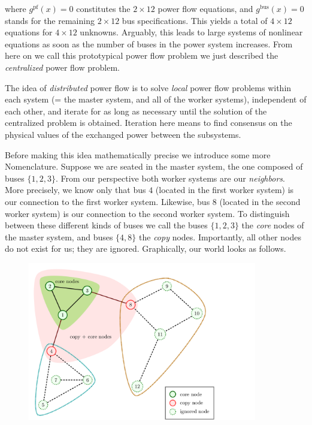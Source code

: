 \documentclass{article}
\newcommand{\state}{x}
\newcommand{\pf}{g^{\text{pf}}}
\newcommand{\busspecs}{g^{\text{bus}}}
\begin{document}
where $\pf( \state ) = 0$ constitutes the $2 \times 12$ power flow equations, and $\busspecs ( \state ) = 0$ stands for the remaining $2 \times 12$ bus specifications.
This yields a total of $4 \times 12$ equations for $4 \times 12$ unknowns.
Arguably, this leads to large systems of nonlinear equations as soon as the number of buses in the power system increases.
From here on we call this prototypical power flow problem we just described the \emph{centralized} power flow problem.

The idea of \emph{distributed} power flow is to solve \emph{local} power flow problems within each system (= the master system, and all of the worker systems), independent of each other, and iterate for as long as necessary until the solution of the centralized problem is obtained.
Iteration here means to find consensus on the physical values of the exchanged power between the subsystems.

Before making this idea mathematically precise we introduce some more Nomenclature.
Suppose we are seated in the master system, the one composed of buses $\{1, 2, 3 \}$.
From our perspective both worker systems are our \emph{neighbors}.
More precisely, we know only that bus $4$ (located in the first worker system) is our connection to the first worker system.
Likewise, bus $8$ (located in the second worker system) is our connection to the second worker system.
To distinguish between these different kinds of buses we call the buses $\{1, 2, 3 \}$ the \emph{core} nodes of the master system, and buses $\{ 4, 8\}$ the \emph{copy} nodes.
Importantly, all other nodes do not exist for us; they are ignored.
Graphically, our world looks as follows.

\begin{figure}
    \includegraphics[width=10cm]{visualization/version_1.png}
\end{figure}
\end{document}
